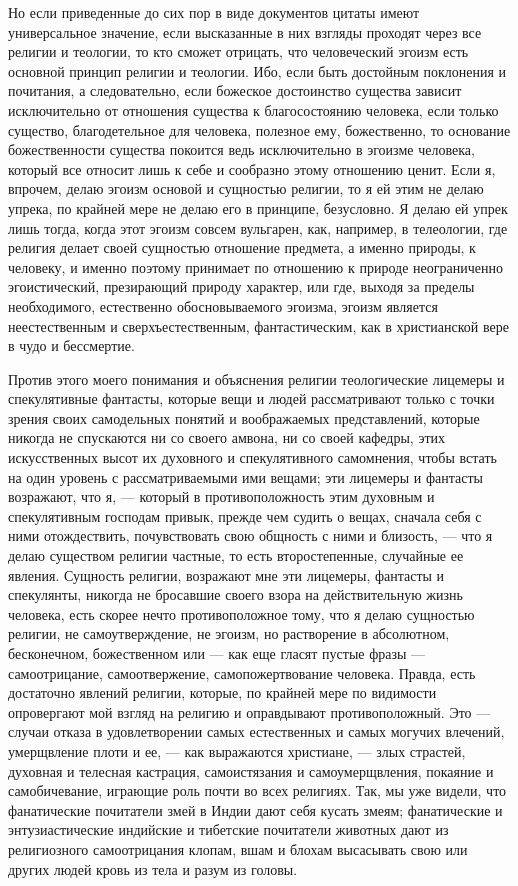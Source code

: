 \documentclass[12pt]{article}
\begin{document}
Но если приведенные до сих пор в виде документов цитаты имеют универсальное значение, если высказанные в них взгляды проходят через все религии и теологии, то кто сможет отрицать, что человеческий эгоизм есть основной принцип религии и теологии. Ибо, если быть достойным поклонения и почитания, а следовательно, если божеское достоинство существа зависит исключительно от отношения существа к благосостоянию человека, если только существо, благодетельное для человека, полезное ему, божественно, то основание божественности существа покоится ведь исключительно в эгоизме человека, который все относит лишь к себе и сообразно этому отношению ценит. Если я, впрочем, делаю эгоизм основой и сущностью религии, то я ей этим не делаю упрека, по крайней мере не делаю его в принципе, безусловно. Я делаю ей упрек лишь тогда, когда этот эгоизм совсем вульгарен, как, например, в телеологии, где религия делает своей сущностью отношение предмета, а именно природы, к человеку, и именно поэтому принимает по отношению к природе неограниченно эгоистический, презирающий природу характер, или где, выходя за пределы необходимого, естественно обосновываемого эгоизма, эгоизм является неестественным и сверхъестественным, фантастическим, как в христианской вере в чудо и бессмертие. 

Против этого моего понимания и объяснения религии теологические лицемеры и спекулятивные фантасты, которые вещи и людей рассматривают только с точки зрения своих самодельных понятий и воображаемых представлений, которые никогда не спускаются ни со своего амвона, ни со своей кафедры, этих искусственных высот их духовного и спекулятивного самомнения, чтобы встать на один уровень с рассматриваемыми ими вещами; эти лицемеры и фантасты возражают, что я, --- который в противоположность этим духовным и спекулятивным господам привык, прежде чем судить о вещах, сначала себя с ними отождествить, почувствовать свою общность с ними и близость, --- что я делаю существом религии частные, то есть второстепенные, случайные ее явления. Сущность религии, возражают мне эти лицемеры, фантасты и спекулянты, никогда не бросавшие своего взора на действительную жизнь человека, есть скорее нечто противоположное тому, что я делаю сущностью религии, не самоутверждение, не эгоизм, но растворение в абсолютном, бесконечном, божественном или --- как еще гласят пустые фразы --- самоотрицание, самоотвержение, самопожертвование человека. Правда, есть достаточно явлений религии, которые, по крайней мере по видимости опровергают мой взгляд на религию и оправдывают противоположный. Это --- случаи отказа в удовлетворении самых естественных и самых могучих влечений, умерщвление плоти и ее, --- как выражаются христиане, --- злых страстей, духовная и телесная кастрация, самоистязания и самоумерщвления, покаяние и самобичевание, играющие роль почти во всех религиях. Так, мы уже видели, что фанатические почитатели змей в Индии дают себя кусать змеям; фанатические и энтузиастические индийские и тибетские почитатели животных дают из религиозного самоотрицания клопам, вшам и блохам высасывать свою или других людей кровь из тела и разум из головы. 
\end{document}
